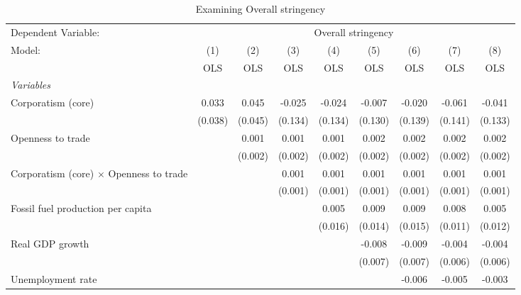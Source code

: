 
\begin{table}[htbp]
   \caption{Examining Overall stringency}
   \centering
   \begin{tabular}{lcccccccc}
      \toprule
      Dependent Variable: & \multicolumn{8}{c}{Overall stringency}\\
      Model:                                         & (1)     & (2)     & (3)     & (4)     & (5)     & (6)     & (7)     & (8)\\  
                                                     &  OLS    & OLS     & OLS     & OLS     & OLS     & OLS     & OLS     & OLS\\  
      \midrule
      \emph{Variables}\\
      Corporatism (core)                             & 0.033   & 0.045   & -0.025  & -0.024  & -0.007  & -0.020  & -0.061  & -0.041\\   
                                                     & (0.038) & (0.045) & (0.134) & (0.134) & (0.130) & (0.139) & (0.141) & (0.133)\\   
      Openness to trade                              &         & 0.001   & 0.001   & 0.001   & 0.002   & 0.002   & 0.002   & 0.002\\   
                                                     &         & (0.002) & (0.002) & (0.002) & (0.002) & (0.002) & (0.002) & (0.002)\\   
      Corporatism (core) $\times$ Openness to trade  &         &         & 0.001   & 0.001   & 0.001   & 0.001   & 0.001   & 0.001\\   
                                                     &         &         & (0.001) & (0.001) & (0.001) & (0.001) & (0.001) & (0.001)\\   
      Fossil fuel production per capita              &         &         &         & 0.005   & 0.009   & 0.009   & 0.008   & 0.005\\   
                                                     &         &         &         & (0.016) & (0.014) & (0.015) & (0.011) & (0.012)\\   
      Real GDP growth                                &         &         &         &         & -0.008  & -0.009  & -0.004  & -0.004\\   
                                                     &         &         &         &         & (0.007) & (0.007) & (0.006) & (0.006)\\   
      Unemployment rate                              &         &         &         &         &         & -0.006  & -0.005  & -0.003\\   

\end{tabular}
\end{table}
